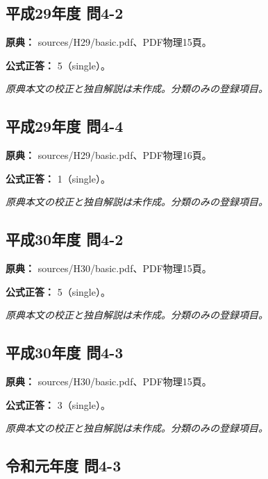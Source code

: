 \subsection{平成29年度 問4-2}
\label{q:h29-reg-basic-4-2}

\noindent\textbf{原典：} sources/H29/basic.pdf、PDF物理15頁。

\textbf{公式正答：} 5（single）。

\par\textit{原典本文の校正と独自解説は未作成。分類のみの登録項目。}

\subsection{平成29年度 問4-4}
\label{q:h29-reg-basic-4-4}

\noindent\textbf{原典：} sources/H29/basic.pdf、PDF物理16頁。

\textbf{公式正答：} 1（single）。

\par\textit{原典本文の校正と独自解説は未作成。分類のみの登録項目。}

\subsection{平成30年度 問4-2}
\label{q:h30-reg-basic-4-2}

\noindent\textbf{原典：} sources/H30/basic.pdf、PDF物理15頁。

\textbf{公式正答：} 5（single）。

\par\textit{原典本文の校正と独自解説は未作成。分類のみの登録項目。}

\subsection{平成30年度 問4-3}
\label{q:h30-reg-basic-4-3}

\noindent\textbf{原典：} sources/H30/basic.pdf、PDF物理15頁。

\textbf{公式正答：} 3（single）。

\par\textit{原典本文の校正と独自解説は未作成。分類のみの登録項目。}

\subsection{令和元年度 問4-3}
\label{q:r01-reg-basic-4-3}

